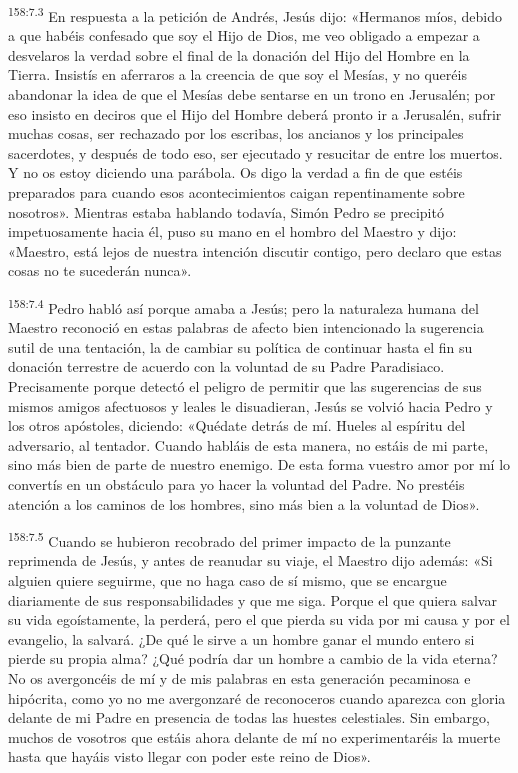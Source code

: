 \par 
\textsuperscript{158:7.3} En respuesta a la petición de Andrés, Jesús dijo: «Hermanos míos, debido a que habéis confesado que soy el Hijo de Dios, me veo obligado a empezar a desvelaros la verdad sobre el final de la donación del Hijo del Hombre en la Tierra. Insistís en aferraros a la creencia de que soy el Mesías, y no queréis abandonar la idea de que el Mesías debe sentarse en un trono en Jerusalén; por eso insisto en deciros que el Hijo del Hombre deberá pronto ir a Jerusalén, sufrir muchas cosas, ser rechazado por los escribas, los ancianos y los principales sacerdotes, y después de todo eso, ser ejecutado y resucitar de entre los muertos. Y no os estoy diciendo una parábola. Os digo la verdad a fin de que estéis preparados para cuando esos acontecimientos caigan repentinamente sobre nosotros». Mientras estaba hablando todavía, Simón Pedro se precipitó impetuosamente hacia él, puso su mano en el hombro del Maestro y dijo: «Maestro, está lejos de nuestra intención discutir contigo, pero declaro que estas cosas no te sucederán nunca».

\par 
\textsuperscript{158:7.4} Pedro habló así porque amaba a Jesús; pero la naturaleza humana del Maestro reconoció en estas palabras de afecto bien intencionado la sugerencia sutil de una tentación, la de cambiar su política de continuar hasta el fin su donación terrestre de acuerdo con la voluntad de su Padre Paradisiaco. Precisamente porque detectó el peligro de permitir que las sugerencias de sus mismos amigos afectuosos y leales le disuadieran, Jesús se volvió hacia Pedro y los otros apóstoles, diciendo: «Quédate detrás de mí. Hueles al espíritu del adversario, al tentador. Cuando habláis de esta manera, no estáis de mi parte, sino más bien de parte de nuestro enemigo. De esta forma vuestro amor por mí lo convertís en un obstáculo para yo hacer la voluntad del Padre. No prestéis atención a los caminos de los hombres, sino más bien a la voluntad de Dios».

\par 
\textsuperscript{158:7.5} Cuando se hubieron recobrado del primer impacto de la punzante reprimenda de Jesús, y antes de reanudar su viaje, el Maestro dijo además: «Si alguien quiere seguirme, que no haga caso de sí mismo, que se encargue diariamente de sus responsabilidades y que me siga. Porque el que quiera salvar su vida egoístamente, la perderá, pero el que pierda su vida por mi causa y por el evangelio, la salvará. ¿De qué le sirve a un hombre ganar el mundo entero si pierde su propia alma? ¿Qué podría dar un hombre a cambio de la vida eterna? No os avergoncéis de mí y de mis palabras en esta generación pecaminosa e hipócrita, como yo no me avergonzaré de reconoceros cuando aparezca con gloria delante de mi Padre en presencia de todas las huestes celestiales. Sin embargo, muchos de vosotros que estáis ahora delante de mí no experimentaréis la muerte hasta que hayáis visto llegar con poder este reino de Dios».

